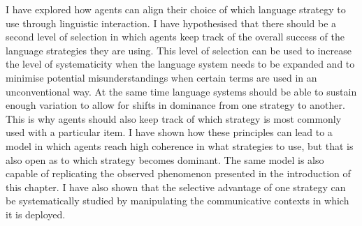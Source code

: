 I have explored how agents can align their choice of which language
strategy to use through linguistic interaction. I have hypothesised
that there should be a second level of selection in which agents keep
track of the overall success of the language strategies they are
using. This level of selection can be used to increase the level of
systematicity when the language system needs to be expanded and to
minimise potential misunderstandings when certain terms are used in an
unconventional way. At the same time language systems should be able
to sustain enough variation to allow for shifts in dominance from one
strategy to another. This is why agents should also keep track of
which strategy is most commonly used with a particular item. I have
shown how these principles can lead to a model in which agents reach
high coherence in what strategies to use, but that is also open as to
which strategy becomes dominant. The same model is also capable of
replicating the observed phenomenon presented in the introduction of
this chapter. I have also shown that the selective advantage of one
strategy can be systematically studied by manipulating the
communicative contexts in which it is deployed.
